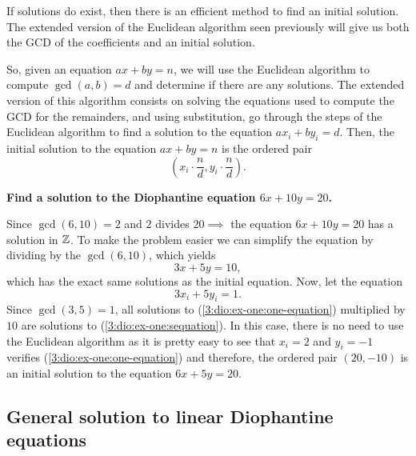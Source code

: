 If solutions do exist, then there is an efficient method to find an initial solution. The extended version
of the Euclidean algorithm seen previously will give us both the GCD of the coefficients and an initial
solution.

So, given an equation $ax + by = n$, we will use the Euclidean algorithm to compute $\gcd\left( a, b \right)
= d$ and determine if there are any solutions. The extended version of this algorithm consists on solving
the equations used to compute the GCD for the remainders, and using substitution, go through the steps of
the Euclidean algorithm to find a solution to the equation $ax_i + by_i = d$. Then, the initial solution
to the equation $ax + by = n$ is the ordered pair
\begin{equation}
    \left( x_i\cdot \frac{n}{d}, y_i\cdot \frac{n}{d} \right).
\end{equation}

\begin{example}
    \textbf{Find a solution to the Diophantine equation $6x + 10y = 20$.}

    Since $\gcd\left( 6, 10 \right) = 2$ and $2$ divides $20\implies$ the equation $6x + 10y = 20$ has a
    solution in $\mathbb{Z}$. To make the problem easier we can simplify the equation by dividing by the $\gcd\left( 6,
    10\right) $, which yields
    \begin{equation}\label{3:dio:ex-one:sequation}
        3x + 5y = 10,
    \end{equation}
    which has the exact same solutions as the initial equation. Now, let the equation
    \begin{equation}\label{3:dio:ex-one:one-equation}
        3x_i + 5y_i = 1.
    \end{equation}
    Since $\gcd\left( 3, 5 \right) = 1$, all solutions to (\ref{3:dio:ex-one:one-equation}) multiplied by
    $10$ are solutions to (\ref{3:dio:ex-one:sequation}). In this case, there is no need to use the Euclidean
    algorithm as it is pretty easy to see that $x_i = 2$ and $y_i = -1$ verifies (\ref{3:dio:ex-one:one-equation})
    and therefore, the ordered pair $\left( 20, -10 \right) $ is an initial solution to the equation $6x + 5y
    = 20$.
\end{example}

\subsection{General solution to linear Diophantine equations}

